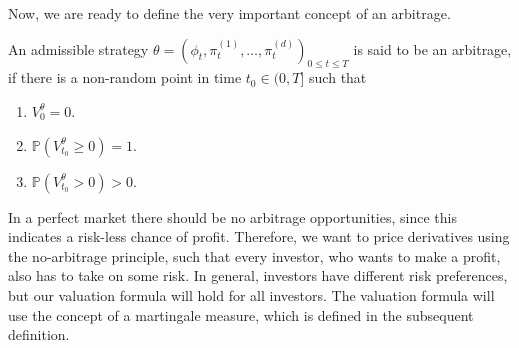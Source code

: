Now, we are ready to define the very important concept of an arbitrage.
\begin{defn}
    An admissible strategy $\theta=(\phi_{t},\pi_{t}^{(1)},\dots, \pi_{t}^{(d)})_{0\leq t\leq T}$ is said to be an arbitrage, if there is a non-random point in time $t_{0}\in (0,T]$ such that
    \begin{enumerate}
        \item $V_{0}^{\theta}=0$.
        \item $\mathbb{P}\left(V_{t_{0}}^{\theta}\geq 0\right)=1$.
        \item $\mathbb{P}\left(V_{t_{0}}^{\theta}>0\right)>0$.
    \end{enumerate}
\end{defn}
In a perfect market there should be no arbitrage opportunities, since this indicates a risk-less chance of profit. Therefore, we want to price derivatives using the no-arbitrage principle, such that every investor, who wants to make a profit, also has to take on some risk. In general, investors have different risk preferences, but our valuation formula will hold for all investors. The valuation formula will use the concept of a martingale measure, which is defined in the subsequent definition.

